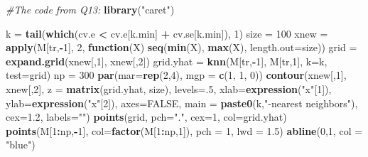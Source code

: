 \documentclass[]{article}
\newenvironment{Shaded}{\begin{snugshade}}{\end{snugshade}}
\newcommand{\KeywordTok}[1]{\textcolor[rgb]{0.13,0.29,0.53}{\textbf{#1}}}
\newcommand{\DataTypeTok}[1]{\textcolor[rgb]{0.13,0.29,0.53}{#1}}
\newcommand{\DecValTok}[1]{\textcolor[rgb]{0.00,0.00,0.81}{#1}}
\newcommand{\FloatTok}[1]{\textcolor[rgb]{0.00,0.00,0.81}{#1}}
\newcommand{\StringTok}[1]{\textcolor[rgb]{0.31,0.60,0.02}{#1}}
\newcommand{\CommentTok}[1]{\textcolor[rgb]{0.56,0.35,0.01}{\textit{#1}}}
\newcommand{\OtherTok}[1]{\textcolor[rgb]{0.56,0.35,0.01}{#1}}
\newcommand{\ControlFlowTok}[1]{\textcolor[rgb]{0.13,0.29,0.53}{\textbf{#1}}}
\newcommand{\OperatorTok}[1]{\textcolor[rgb]{0.81,0.36,0.00}{\textbf{#1}}}
\newcommand{\NormalTok}[1]{#1}
\begin{document}
\begin{Shaded}
\begin{Highlighting}[]
\CommentTok{#The code from Q13:}
\KeywordTok{library}\NormalTok{(}\StringTok{"caret"}\NormalTok{)}

\NormalTok{k =}\StringTok{ }\KeywordTok{tail}\NormalTok{(}\KeywordTok{which}\NormalTok{(cv.e }\OperatorTok{<}\StringTok{ }\NormalTok{cv.e[k.min] }\OperatorTok{+}\StringTok{ }\NormalTok{cv.se[k.min]), }\DecValTok{1}\NormalTok{)}
\NormalTok{size =}\StringTok{ }\DecValTok{100}
\NormalTok{xnew =}\StringTok{ }\KeywordTok{apply}\NormalTok{(M[tr,}\OperatorTok{-}\DecValTok{1}\NormalTok{], }\DecValTok{2}\NormalTok{, }\ControlFlowTok{function}\NormalTok{(X) }\KeywordTok{seq}\NormalTok{(}\KeywordTok{min}\NormalTok{(X), }\KeywordTok{max}\NormalTok{(X), }\DataTypeTok{length.out=}\NormalTok{size))}
\NormalTok{grid =}\StringTok{ }\KeywordTok{expand.grid}\NormalTok{(xnew[,}\DecValTok{1}\NormalTok{], xnew[,}\DecValTok{2}\NormalTok{])}
\NormalTok{grid.yhat =}\StringTok{ }\KeywordTok{knn}\NormalTok{(M[tr,}\OperatorTok{-}\DecValTok{1}\NormalTok{], M[tr,}\DecValTok{1}\NormalTok{], }\DataTypeTok{k=}\NormalTok{k, }\DataTypeTok{test=}\NormalTok{grid)}
\NormalTok{np =}\StringTok{ }\DecValTok{300}
\KeywordTok{par}\NormalTok{(}\DataTypeTok{mar=}\KeywordTok{rep}\NormalTok{(}\DecValTok{2}\NormalTok{,}\DecValTok{4}\NormalTok{), }\DataTypeTok{mgp =} \KeywordTok{c}\NormalTok{(}\DecValTok{1}\NormalTok{, }\DecValTok{1}\NormalTok{, }\DecValTok{0}\NormalTok{))}
\KeywordTok{contour}\NormalTok{(xnew[,}\DecValTok{1}\NormalTok{], xnew[,}\DecValTok{2}\NormalTok{], }\DataTypeTok{z =} \KeywordTok{matrix}\NormalTok{(grid.yhat, size), }\DataTypeTok{levels=}\NormalTok{.}\DecValTok{5}\NormalTok{, }
        \DataTypeTok{xlab=}\KeywordTok{expression}\NormalTok{(}\StringTok{"x"}\NormalTok{[}\DecValTok{1}\NormalTok{]), }\DataTypeTok{ylab=}\KeywordTok{expression}\NormalTok{(}\StringTok{"x"}\NormalTok{[}\DecValTok{2}\NormalTok{]), }\DataTypeTok{axes=}\OtherTok{FALSE}\NormalTok{,}
        \DataTypeTok{main =} \KeywordTok{paste0}\NormalTok{(k,}\StringTok{"-nearest neighbors"}\NormalTok{), }\DataTypeTok{cex=}\FloatTok{1.2}\NormalTok{, }\DataTypeTok{labels=}\StringTok{""}\NormalTok{)}
\KeywordTok{points}\NormalTok{(grid, }\DataTypeTok{pch=}\StringTok{"."}\NormalTok{, }\DataTypeTok{cex=}\DecValTok{1}\NormalTok{, }\DataTypeTok{col=}\NormalTok{grid.yhat)}
\KeywordTok{points}\NormalTok{(M[}\DecValTok{1}\OperatorTok{:}\NormalTok{np,}\OperatorTok{-}\DecValTok{1}\NormalTok{], }\DataTypeTok{col=}\KeywordTok{factor}\NormalTok{(M[}\DecValTok{1}\OperatorTok{:}\NormalTok{np,}\DecValTok{1}\NormalTok{]), }\DataTypeTok{pch =} \DecValTok{1}\NormalTok{, }\DataTypeTok{lwd =} \FloatTok{1.5}\NormalTok{)}
\KeywordTok{abline}\NormalTok{(}\DecValTok{0}\NormalTok{,}\DecValTok{1}\NormalTok{, }\DataTypeTok{col =} \StringTok{"blue"}\NormalTok{)}


\end{Highlighting}
\end{Shaded}
\end{document}
